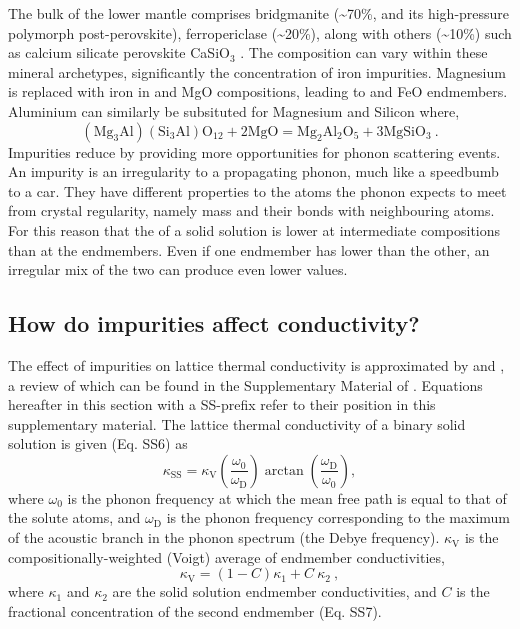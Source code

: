 The bulk of the lower mantle comprises bridgmanite (\textasciitilde70\%, and its high-pressure polymorph post-perovskite), ferropericlase (\textasciitilde20\%), along with others (\textasciitilde10\%) such as calcium silicate perovskite CaSiO$_3$ \citep{Tronnes2009}. The composition can vary within these mineral archetypes, significantly the concentration of iron impurities. Magnesium is replaced with iron in \mgsios and MgO compositions, leading to \fesios and FeO endmembers. Aluminium can similarly be subsituted for Magnesium and Silicon
\citep[as in][]{Brodholt2000} where,
%
\begin{equation}
\mathrm{ \left ( Mg_{3}Al \right )\left ( Si_{3}Al \right )O_{12} + 2MgO = Mg_{2}Al_{2}O_{5} + 3MgSiO_{3} }\ .
\label{eq.brodholt_al}
\end{equation}
%
Impurities reduce \tcs by providing more opportunities for phonon scattering events. An impurity is an irregularity to a propagating phonon, much like a speedbumb to a car. They have different properties to the atoms the phonon expects to meet from crystal regularity, namely mass and their bonds with neighbouring atoms. For this reason that the \tcs of a solid solution is lower at intermediate compositions than at the endmembers. Even if one endmember has lower \cs than the other, an irregular mix of the two can produce even lower values.


\subsection{How do impurities affect conductivity?} 
\label{impur_theory}

The effect of impurities on lattice thermal conductivity is approximated by \citet{Klemens1960} and \citet{Padture1997}, a review of which can be found in the Supplementary Material of \citet{Stackhouse2015}. Equations hereafter in this section with a SS-prefix refer to their position in this supplementary material. The lattice thermal conductivity of a binary solid solution is given (Eq. SS6) as
%
\begin{equation}
\kappa_{\mathrm{SS}}=\kappa_{\mathrm{V}}\left ( \frac{\omega_{\mathrm{0}}}{\omega_{\mathrm{D}}} \right )\arctan \left ( \frac{\omega_{\mathrm{D}}}{\omega_{\mathrm{0}}} \right ),
\label{eq.SS2015SM.6}
\end{equation}
%
where $\omega_{\mathrm{0}}$ is the phonon frequency at which the mean free path is equal to that of the solute atoms, and $\omega_{\mathrm{D}}$ is the phonon frequency corresponding to the maximum of the acoustic branch in the phonon spectrum (the Debye frequency). $\kappa_{\mathrm{V}}$ is the compositionally-weighted (Voigt) average of endmember conductivities, 
%
\begin{equation}
\kappa_{\mathrm{V}}=\left ( 1-C \right )\kappa_{1} + C\ \kappa_{2} \ ,
\label{eq.SS2015SM.7}
\end{equation}
%
where $\kappa_{\mathrm{1}}$ and $\kappa_{\mathrm{2}}$ are the solid solution endmember conductivities, and $C$ is the fractional concentration of the second endmember (Eq. SS7).

